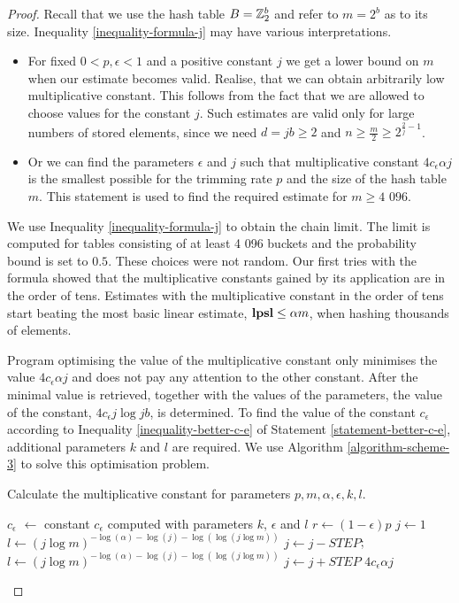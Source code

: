 \begin{proof}
Recall that we use the hash table $B = \mathbb{Z}_{2}^{b}$ and refer to $m = 2 ^ b$ as to its size. Inequality \ref{inequality-formula-j} may have various interpretations.
\begin{itemize}
\item For fixed $0 < p, \epsilon < 1$ and a positive constant $j$ we get a lower bound on $m$ when our estimate becomes valid. Realise, that we can obtain arbitrarily low multiplicative constant. This follows from the fact that we are allowed to choose values for the constant $j$. Such estimates are valid only for large numbers of stored elements, since we need $d = jb \geq 2$ and $n \geq \frac{m}{2} \geq 2 ^ {\frac{2}{j} - 1}$.
\item Or we can find the parameters $\epsilon$ and $j$ such that multiplicative constant $4 c_\epsilon \alpha j$ is the smallest possible for the trimming rate $p$ and the size of the hash table $m$. This statement is used to find the required estimate for $m \geq \text{4 096}$.
\end{itemize}

We use Inequality \ref{inequality-formula-j} to obtain the chain limit. The limit is computed for tables consisting of at least 4 096 buckets and the probability bound is set to $0.5$. These choices were not random. Our first tries with the formula showed that the multiplicative constants gained by its application are in the order of tens. Estimates with the multiplicative constant in the order of tens start beating the most basic linear estimate, $\mathbf{lpsl} \leq \alpha m$, when hashing thousands of elements.

Program optimising the value of the multiplicative constant only minimises the value $4 c_\epsilon \alpha j$ and does not pay any attention to the other constant. After the minimal value is retrieved, together with the values of the parameters, the value of the constant, $4 c_\epsilon j \log j b$, is determined. To find the value of the constant $c_\epsilon$ according to Inequality \ref{inequality-better-c-e} of Statement \ref{statement-better-c-e}, additional parameters $k$ and $l$ are required. We use Algorithm \ref{algorithm-scheme-3} to solve this optimisation problem.

\begin{algorithm}[H]
\caption{Calculate the multiplicative constant for parameters $p, m, \alpha, \epsilon, k, l$.}
\label{procedure-scheme-3}
\begin{algorithmic}
\STATE $c_\epsilon$ $\leftarrow$ constant $c_\epsilon$ computed with parameters $k$, $\epsilon$ and $l$
\STATE $r \leftarrow (1 - \epsilon)p$ 
\STATE $j \leftarrow 1$
\STATE 
\STATE {}
\STATE $l \leftarrow (j \log m) ^ {-\log(\alpha) - \log(j) - \log(\log(j \log m))}$
	\STATE $j \leftarrow j - STEP$;
	\STATE $l \leftarrow (j \log m) ^ {-\log(\alpha) - \log(j) - \log(\log(j \log m))}$
\ENDWHILE
\STATE
\STATE $j \leftarrow j + STEP$
\RETURN $4 c_\epsilon \alpha j$
\end{algorithmic}
\end{algorithm}


\end{proof}
